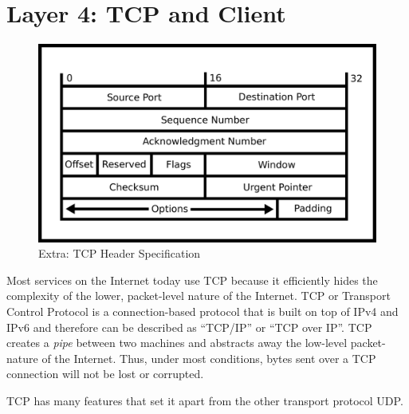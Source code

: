 \section{Layer 4: TCP and Client}


\begin{figure}[H]
  \centering
\includegraphics[width=.8\textwidth]{networking/drawings/tcp_header.eps}
\caption{Extra: TCP Header Specification}
\end{figure}

Most services on the Internet today use \gls{TCP} because it efficiently hides the complexity of the lower, packet-level nature of the Internet.
TCP or Transport Control Protocol is a connection-based protocol that is built on top of IPv4 and IPv6 and therefore can be described as ``TCP/IP'' or ``TCP over IP''.
TCP creates a \emph{pipe} between two machines and abstracts away the low-level packet-nature of the Internet. Thus, under most conditions, bytes sent over a TCP connection will not be lost or corrupted.

TCP has many features that set it apart from the other transport protocol UDP.

